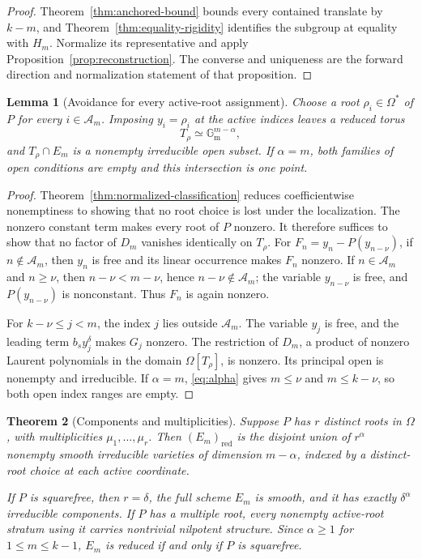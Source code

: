 \documentclass[11pt]{article}
\newcommand{\Gm}{\mathbb{G}_{\mathrm m}}
\newcommand{\Om}{\Omega}
\newcommand{\red}{\mathrm{red}}
\newtheorem{lemma}{Lemma}[section]
\newtheorem{theorem}[lemma]{Theorem}
\theoremstyle{remark}
\numberwithin{equation}{section}
\begin{document}
\begin{proof}
Theorem~\ref{thm:anchored-bound} bounds every contained translate by \(k-m\), and Theorem~\ref{thm:equality-rigidity} identifies the subgroup at equality with \(H_m\).  Normalize its representative and apply Proposition~\ref{prop:reconstruction}.  The converse and uniqueness are the forward direction and normalization statement of that proposition.
\end{proof}

\begin{lemma}[Avoidance for every active-root assignment]\label{lem:avoidance}
Choose a root \(\rho_i\in\Om^\ast\) of \(P\) for every \(i\in\mathcal A_m\).  Imposing \(y_i=\rho_i\) at the active indices leaves a reduced torus
\[
 T_\rho\simeq\Gm^{m-\alpha},
\]
and \(T_\rho\cap E_m\) is a nonempty irreducible open subset.  If \(\alpha=m\), both families of open conditions are empty and this intersection is one point.
\end{lemma}

\begin{proof}
Theorem~\ref{thm:normalized-classification} reduces coefficientwise nonemptiness to showing that no root choice is lost under the localization.  The nonzero constant term makes every root of \(P\) nonzero.  It therefore suffices to show that no factor of \(D_m\) vanishes identically on \(T_\rho\).  For \(F_n=y_n-P(y_{n-\nu})\), if \(n\notin\mathcal A_m\), then \(y_n\) is free and its linear occurrence makes \(F_n\) nonzero.  If \(n\in\mathcal A_m\) and \(n\geq\nu\), then \(n-\nu<m-\nu\), hence \(n-\nu\notin\mathcal A_m\); the variable \(y_{n-\nu}\) is free, and \(P(y_{n-\nu})\) is nonconstant.  Thus \(F_n\) is again nonzero.

For \(k-\nu\leq j<m\), the index \(j\) lies outside \(\mathcal A_m\).  The variable \(y_j\) is free, and the leading term \(b_s y_j^\delta\) makes \(G_j\) nonzero.  The restriction of \(D_m\), a product of nonzero Laurent polynomials in the domain \(\Om[T_\rho]\), is nonzero.  Its principal open is nonempty and irreducible.  If \(\alpha=m\), \eqref{eq:alpha} gives \(m\leq\nu\) and \(m\leq k-\nu\), so both open index ranges are empty.
\end{proof}

\begin{theorem}[Components and multiplicities]\label{thm:partA-geometry}
Suppose \(P\) has \(r\) distinct roots in \(\Om\), with multiplicities \(\mu_1,\ldots,\mu_r\).  Then \((E_m)_{\red}\) is the disjoint union of \(r^\alpha\) nonempty smooth irreducible varieties of dimension \(m-\alpha\), indexed by a distinct-root choice at each active coordinate.

If \(P\) is squarefree, then \(r=\delta\), the full scheme \(E_m\) is smooth, and it has exactly \(\delta^\alpha\) irreducible components.  If \(P\) has a multiple root, every nonempty active-root stratum using it carries nontrivial nilpotent structure.  Since \(\alpha\geq1\) for \(1\leq m\leq k-1\), \(E_m\) is reduced if and only if \(P\) is squarefree.
\end{theorem}
\end{document}
